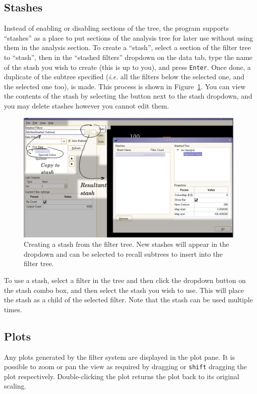 \documentclass[10pt]{article}
\begin{document}
{\subsection{Stashes}

Instead of enabling or disabling sections of the tree, the program supports ``stashes'' as a place to put sections of the analysis tree for later use without using them in the analysis section. To create a ``stash'', select a section of the filter tree to ``stash'', then in the ``stashed filters'' dropdown on the data tab, type the name of the stash you wish to create (this is up to you), and press \texttt{Enter}. Once done, a duplicate of the subtree specified (\emph{i.e.} all the filters below the selected one, and the selected one too), is made. This process is shown in Figure~\ref{fig:stash-creation}. You can view the contents of the stash by selecting the button next to the stash dropdown, and you may delete stashes however you cannot edit them.  


\begin{figure}[ht]
  \centering
 \includegraphics[width=0.6 \textwidth,keepaspectratio=true]{./figures/Stash-operation.png}
 \caption{Creating a stash from the filter tree. New stashes will appear in the dropdown and can be selected to recall subtrees to insert into the filter tree.}
 \label{fig:stash-creation}

\end{figure}

To use a stash, select a filter in the tree and then click the dropdown button on the stash combo box, and then select the stash you wish to use. This will place the stash as a child of the selected filter. Note that the stash can be used multiple times.  

\subsection{Plots}
Any plots generated by the filter system are displayed in the plot pane. It is possible to zoom or pan the view as required by dragging or \texttt{shift} dragging the plot respectively. Double-clicking the plot returns the plot back to its original scaling.

}
\end{document}
